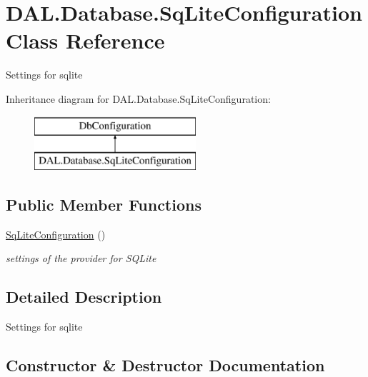 \hypertarget{class_d_a_l_1_1_database_1_1_sq_lite_configuration}{}\section{D\+A\+L.\+Database.\+Sq\+Lite\+Configuration Class Reference}
\label{class_d_a_l_1_1_database_1_1_sq_lite_configuration}


Settings for sqlite  


Inheritance diagram for D\+A\+L.\+Database.\+Sq\+Lite\+Configuration\+:\begin{figure}[H]
\begin{center}
\leavevmode
\includegraphics[height=2.000000cm]{class_d_a_l_1_1_database_1_1_sq_lite_configuration}
\end{center}
\end{figure}
\subsection*{Public Member Functions}
\begin{DoxyCompactItemize}
\item 
\hyperlink{class_d_a_l_1_1_database_1_1_sq_lite_configuration_af3159b6c66b120187944bfe862d6acde}{Sq\+Lite\+Configuration} ()
\begin{DoxyCompactList}\small\item\em settings of the provider for S\+Q\+Lite \end{DoxyCompactList}\end{DoxyCompactItemize}


\subsection{Detailed Description}
Settings for sqlite 



\subsection{Constructor \& Destructor Documentation}
\mbox{\label{class_d_a_l_1_1_database_1_1_sq_lite_configuration_af3159b6c66b120187944bfe862d6acde}} 
